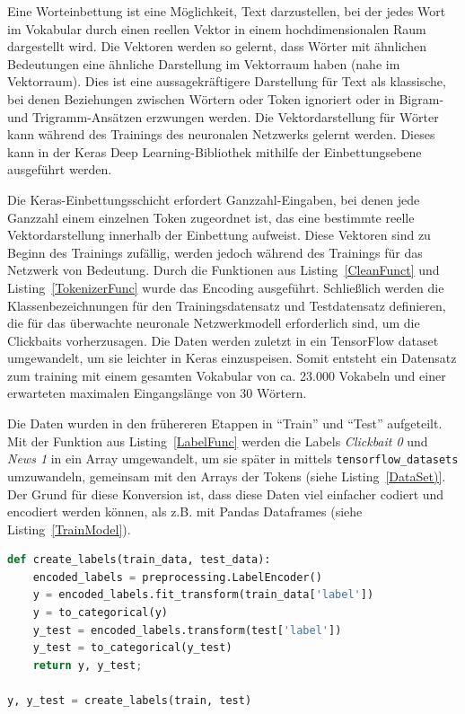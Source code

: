 Eine Worteinbettung ist eine Möglichkeit, Text darzustellen, bei der jedes Wort im Vokabular durch einen reellen Vektor in einem hochdimensionalen Raum dargestellt wird. Die Vektoren werden so gelernt, dass Wörter mit ähnlichen Bedeutungen eine ähnliche Darstellung im Vektorraum haben (nahe im Vektorraum). Dies ist eine aussagekräftigere Darstellung für Text als klassische, bei denen Beziehungen zwischen Wörtern oder Token ignoriert oder in Bigram- und Trigramm-Ansätzen erzwungen werden. Die Vektordarstellung für Wörter kann während des Trainings des neuronalen Netzwerks gelernt werden. Dieses kann in der Keras Deep Learning-Bibliothek mithilfe der Einbettungsebene ausgeführt werden. 


Die Keras-Einbettungsschicht erfordert Ganzzahl-Eingaben, bei denen jede Ganzzahl einem einzelnen Token zugeordnet ist, das eine bestimmte reelle Vektordarstellung innerhalb der Einbettung aufweist. Diese Vektoren sind zu Beginn des Trainings zufällig, werden jedoch während des Trainings für das Netzwerk von Bedeutung. Durch die Funktionen aus Listing~\ref{CleanFunct} und Listing~\ref{TokenizerFunc} wurde das Encoding ausgeführt. Schließlich werden die Klassenbezeichnungen für den Trainingsdatensatz und Testdatensatz definieren, die für das überwachte neuronale Netzwerkmodell erforderlich sind, um die Clickbaits vorherzusagen. Die Daten werden zuletzt in ein TensorFlow dataset umgewandelt, um sie leichter in Keras einzuspeisen. Somit entsteht ein Datensatz zum training mit einem gesamten Vokabular von ca. 23.000 Vokabeln und einer erwarteten maximalen Eingangslänge von 30 Wörtern.

Die Daten wurden in den frühereren Etappen in \enquote{Train} und \enquote{Test} aufgeteilt. Mit der Funktion aus Listing~\ref{LabelFunc} werden die Labels \textit{Clickbait 0} und  \textit{News 1} in ein Array umgewandelt, um sie später in mittels \texttt{tensorflow\_datasets} umzuwandeln, gemeinsam mit den Arrays der Tokens (siehe Listing~\ref{DataSet)}. Der Grund für diese Konversion ist, dass diese Daten viel einfacher codiert und encodiert werden können, als z.B. mit Pandas Dataframes (siehe Listing~\ref{TrainModel}).


\begin{lstlisting}[language=Python,caption=Die Label-Funktion]
def create_labels(train_data, test_data):
    encoded_labels = preprocessing.LabelEncoder()
    y = encoded_labels.fit_transform(train_data['label'])
    y = to_categorical(y)
    y_test = encoded_labels.transform(test['label'])
    y_test = to_categorical(y_test)
    return y, y_test;

y, y_test = create_labels(train, test)
\end{lstlisting}\label{LabelFunc}

